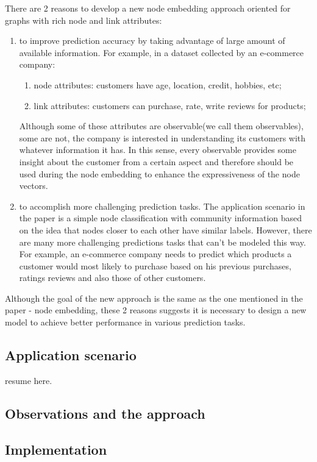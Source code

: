 \documentclass{article}
\begin{document}
There are 2 reasons to develop a new node embedding approach oriented for graphs with rich node and link attributes:
\begin{enumerate}
	\item to improve prediction accuracy by taking advantage of large amount of available information. For example, in a dataset collected by an e-commerce company:
	\begin{enumerate}
		\item node attributes: customers have age, location, credit, hobbies, etc;
		\item link attributes: customers can purchase, rate, write reviews for products;
	\end{enumerate}
	Although some of these attributes are observable(we call them observables), some are not, the company is interested in understanding its customers with whatever information it has. In this sense, every observable provides some insight about the customer from a certain aspect and therefore should be used during the node embedding to enhance the expressiveness of the node vectors.
	\item to accomplish more challenging prediction tasks. The application scenario in the paper is a simple node classification with community information based on the idea that nodes closer to each other have similar labels. However, there are many more challenging predictions tasks that can't be modeled this way. For example, an e-commerce company needs to predict which products a customer would most likely to purchase based on his previous purchases, ratings reviews and also those of other customers.
\end{enumerate}
Although the goal of the new approach is the same as the one mentioned in the paper - node embedding, these 2 reasons suggests it is necessary to design a new model to achieve better performance in various prediction tasks.

\subsection{Application scenario}
resume here.

\subsection{Observations and the approach}

\subsection{Implementation}



\end{document}
